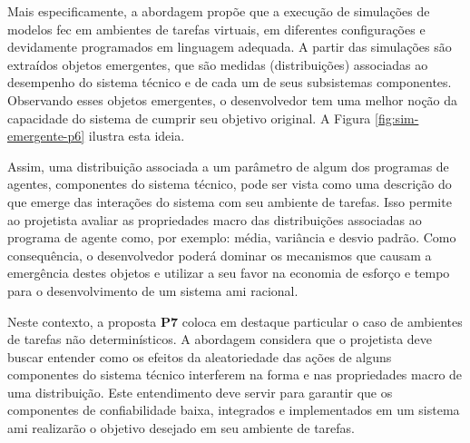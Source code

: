     Mais especificamente, a abordagem propõe que a execução de simulações de modelos \acrshort{fec} em ambientes de tarefas virtuais, em diferentes configurações e devidamente programados em linguagem adequada. A partir das simulações são extraídos objetos emergentes, que são medidas (distribuições) associadas ao desempenho do sistema técnico e de cada um de seus subsistemas componentes. Observando esses objetos emergentes, o desenvolvedor tem uma melhor noção da capacidade do sistema de cumprir seu objetivo original. A Figura \ref{fig:sim-emergente-p6} ilustra esta ideia.
        
    \begin{figure}[h!]
        \centering
    \end{figure}
    
    Assim, uma distribuição associada a um parâmetro de algum dos programas de agentes, componentes do sistema técnico, pode ser vista como uma descrição do que emerge das interações do sistema com seu ambiente de tarefas. Isso permite ao projetista avaliar as propriedades macro das distribuições associadas ao programa de agente como, por exemplo: média, variância e desvio padrão. Como consequência, o desenvolvedor poderá dominar os mecanismos que causam a emergência destes objetos e utilizar a seu favor na economia de esforço e tempo para o desenvolvimento de um sistema \acrshort{ami} racional. 
    
    Neste contexto, a proposta \textbf{P7} coloca em destaque particular o caso de ambientes de tarefas não determinísticos. A abordagem considera que o projetista deve buscar entender como os efeitos da aleatoriedade das ações de alguns componentes do sistema técnico interferem na forma e nas propriedades macro de uma distribuição. Este entendimento deve servir para garantir que os componentes de confiabilidade baixa, integrados e implementados em um sistema \acrshort{ami} realizarão o objetivo desejado em seu ambiente de tarefas.
    
